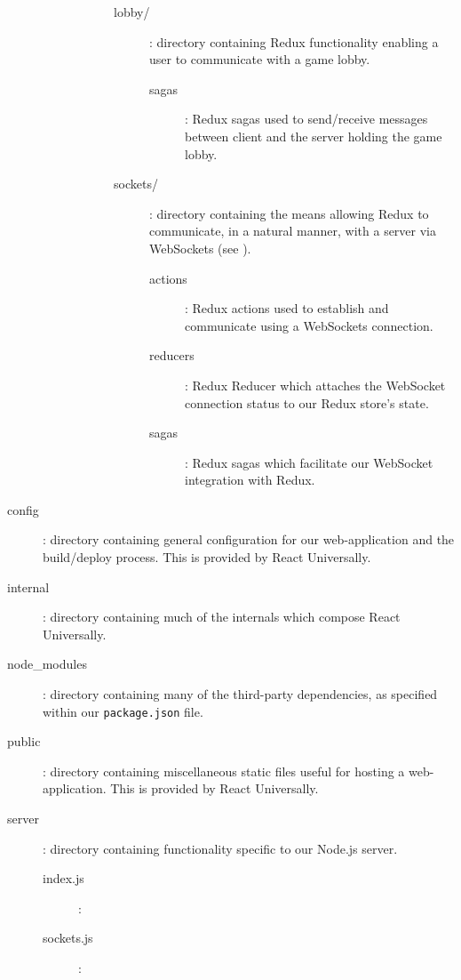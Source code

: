 \documentclass{standalone}
\begin{document}
\begin{formal}
\begin{description}
\begin{description}
\begin{description}
\begin{description}
			        	\item[lobby/]: directory containing Redux functionality enabling a user to communicate with a game lobby.
		      			\begin{description}
			        		\item[sagas]: Redux sagas used to send/receive messages between client and the server holding the game lobby.
		      			\end{description}

			        	\item[sockets/]: directory containing the means allowing Redux to communicate, in a natural manner, with a server via WebSockets (see ).
		      			\begin{description}
			        	\item[actions]: Redux actions used to establish and communicate using a WebSockets connection.
			        	\item[reducers]: Redux Reducer which attaches the WebSocket connection status to our Redux store's state.
			        	\item[sagas]: Redux sagas which facilitate our WebSocket integration with Redux. 
		      			\end{description}
		      		\end{description}
	      		\end{description}
	      	\end{description}

	        \item[config]: directory containing general configuration for our web-application and the build/deploy process. This is provided by React Universally.

	        \item[internal]: directory containing much of the internals which compose React Universally.

	      	\item[node\_modules]: directory containing many of the third-party dependencies, as specified within our \texttt{package.json} file.

	      	\item[public]: directory containing miscellaneous static files useful for hosting a web-application. This is provided by React Universally.

	      	\item[server]: directory containing functionality specific to our Node.js server.
		        \begin{description}
		        	\item[index.js]:
		        	\item[sockets.js]:


\end{description}
\end{description}
\end{formal}
\end{document}
